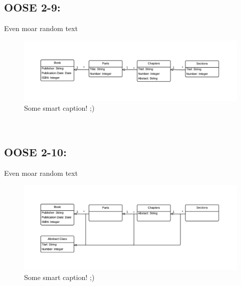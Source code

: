 \documentclass[11pt,a4paper]{article}
\begin{document}
\newpage
\subsection{OOSE 2-9:}
Even moar random text \\
\begin{figure}[h!]
    \centering
    \includegraphics[width=1.1\textwidth]{pictures/oose2_9}
    \caption{Some smart caption! ;)}
    \label{fig:OOSE29}
\end{figure}
\\

\subsection{OOSE 2-10:}
Even moar random text \\
\begin{figure}[h!]
    \centering
    \includegraphics[width=1.1\textwidth]{pictures/oose2_10}
    \caption{Some smart caption! ;)}
    \label{fig:OOSE210}
\end{figure}
\\
\end{document}
